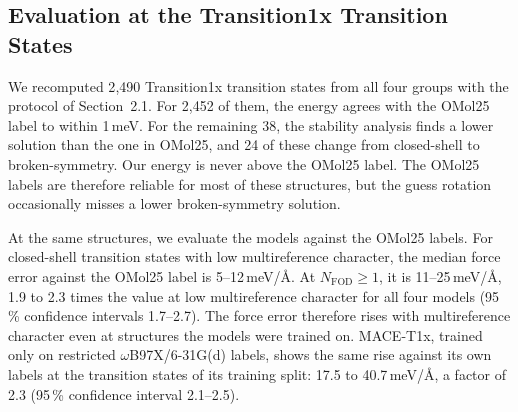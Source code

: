 \subsection{Evaluation at the Transition1x Transition States}
\label{sec:labelcheck}
We recomputed 2{,}490 Transition1x transition states from all four groups with the protocol of Section~2.1. For 2{,}452 of them, the energy agrees with the OMol25 label to within 1\,meV. For the remaining 38, the stability analysis finds a lower solution than the one in OMol25, and 24 of these change from closed-shell to broken-symmetry. Our energy is never above the OMol25 label. The OMol25 labels are therefore reliable for most of these structures, but the guess rotation occasionally misses a lower broken-symmetry solution.

At the same structures, we evaluate the models against the OMol25 labels. For closed-shell transition states with low multireference character, the median force error against the OMol25 label is 5--12\,meV/\AA{}. At $N_\mathrm{FOD} \geq 1$, it is 11--25\,meV/\AA{}, 1.9 to 2.3 times the value at low multireference character for all four models (95\,\% confidence intervals 1.7--2.7). The force error therefore rises with multireference character even at structures the models were trained on. MACE-T1x, trained only on restricted $\omega$B97X/6-31G(d) labels, shows the same rise against its own labels at the transition states of its training split: 17.5 to 40.7\,meV/\AA{}, a factor of 2.3 (95\,\% confidence interval 2.1--2.5).



